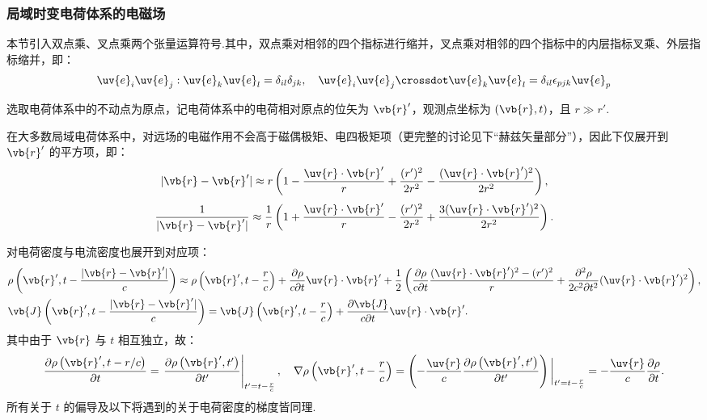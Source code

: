 \subsubsection{局域时变电荷体系的电磁场}

本节引入双点乘、叉点乘两个张量运算符号.其中，双点乘对相邻的四个指标进行缩并，叉点乘对相邻的四个指标中的内层指标叉乘、外层指标缩并，即：
\begin{equation*}
	\uv{e}_i \uv{e}_j : \uv{e}_k \uv{e}_l = \delta_{il} \delta_{jk}, \quad
	\uv{e}_i \uv{e}_j \crossdot \uv{e}_k \uv{e}_l = \delta_{il} \epsilon_{pjk} \uv{e}_p
\end{equation*}

选取电荷体系中的不动点为原点，记电荷体系中的电荷相对原点的位矢为 \(\vb{r}'\)，观测点坐标为 \((\vb{r}, t)\)，且 \(r \gg r'\).

在大多数局域电荷体系中，对远场的电磁作用不会高于磁偶极矩、电四极矩项（更完整的讨论见下“赫兹矢量部分”），因此下仅展开到 \(\vb{r}'\) 的平方项，即：
\begin{equation*}
	|\vb{r} - \vb{r}'| \approx r \left( 1 - \frac{\uv{r} \cdot \vb{r}'}{r} + \frac{(r')^2}{2r^2} - \frac{(\uv{r} \cdot \vb{r}')^2}{2r^2} \right),
\end{equation*}
\begin{equation*}
	\frac{1}{|\vb{r} - \vb{r}'|} \approx \frac{1}{r} \left( 1 + \frac{\uv{r} \cdot \vb{r}'}{r} - \frac{(r')^2}{2r^2} + \frac{3(\uv{r} \cdot \vb{r}')^2}{2r^2} \right).
\end{equation*}

对电荷密度与电流密度也展开到对应项：
\begin{align*}
	&\rho\left( \vb{r}', t - \frac{|\vb{r} - \vb{r}'|}{c} \right) \approx \rho\left( \vb{r}', t - \frac{r}{c} \right) + \frac{\partial \rho}{c \partial t} \uv{r} \cdot \vb{r}' + \frac{1}{2} \left( \frac{\partial \rho}{c \partial t} \frac{(\uv{r} \cdot \vb{r}')^2 - (r')^2}{r} + \frac{\partial^2 \rho}{2c^2 \partial t^2} (\uv{r} \cdot \vb{r}')^2 \right),\\
	&\vb{J}\left( \vb{r}', t - \frac{|\vb{r} - \vb{r}'|}{c} \right) = \vb{J}\left( \vb{r}', t - \frac{r}{c} \right) + \frac{\partial \vb{J}}{c \partial t} \uv{r} \cdot \vb{r}'.
\end{align*}
其中由于 \(\vb{r}\) 与 \(t\) 相互独立，故：
\begin{equation*}
	\frac{\partial \rho\left( \vb{r}', t - r/c  \right)}{\partial t} = \left. \frac{\partial \rho\left( \vb{r}', t' \right)}{\partial t'} \right|_{t' = t - \frac{r}{c}}, \quad
	\nabla \rho\left( \vb{r}', t - \frac{r}{c} \right) = \left( -\frac{\uv{r}}{c} \frac{\partial \rho\left( \vb{r}', t' \right)}{\partial t'} \right) \bigg|_{t' = t - \frac{r}{c}} = -\frac{\uv{r}}{c} \frac{\partial \rho}{\partial t}.
\end{equation*}
所有关于 \(t\) 的偏导及以下将遇到的关于电荷密度的梯度皆同理.

